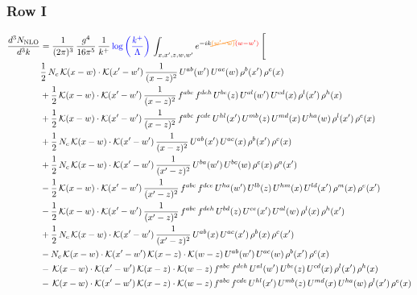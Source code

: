 \documentclass[9pt]{article}
\numberwithin{equation}{section}
\begin{document}
\subsubsection{Row I}
\begin{align}
\frac{d^{3}N_{\mathrm{NLO}}}{d^{3}k} & = \frac{1}{(2\pi)^{3}}\,\frac{g^{4}}{16\pi^{5}}\,\frac{1}{k^{+}}\,{\color{blue}\log{\left(\frac{k^{+}}{\Lambda}\right)}}\,\int_{x,x',z,w,w'}e^{-ik{\color{orange}\cancel{(w'-w)}}{\color{red}(w-w')}}\,\Bigg[\notag\\ & \frac{1}{2}\,N_{c}\,\mathcal{K}(x-w)\cdot\mathcal{K}(x'-w')\,\frac{1}{(x-z)^{2}}\,U^{ab}(w')\,U^{ac}(w)\,\rho^{b}(x')\,\rho^{c}(x)\notag\\
& +\frac{1}{2}\,\mathcal{K}(x-w)\cdot\mathcal{K}(x'-w')\,\frac{1}{(x-z)^{2}}\,f^{abc}\,f^{deh}\,U^{be}(z)\,U^{al}(w')\,U^{cd}(x)\,\rho^{l}(x')\,\rho^{h}(x)\notag\\
& +\frac{1}{2}\,\mathcal{K}(x-w)\cdot\mathcal{K}(x'-w')\,\frac{1}{(x-z)^{2}}\,f^{abc}\,f^{cde}\,U^{hl}(x')\,U^{mb}(z)\,U^{md}(x)\,U^{ha}(w)\,\rho^{l}(x')\,\rho^{e}(x)\notag\\
& +\frac{1}{2}\,N_{c}\,\mathcal{K}(x-w)\cdot\mathcal{K}(x'-w')\,\frac{1}{(x-z)^{2}}\,U^{ab}(x')\,U^{ac}(x)\,\rho^{b}(x')\,\rho^{c}(x)\notag\\
& +\frac{1}{2}\,N_{c}\,\mathcal{K}(x-w)\cdot\mathcal{K}(x'-w')\,\frac{1}{(x'-z)^{2}}\,U^{ba}(w')\,U^{bc}(w)\,\rho^{c}(x)\,\rho^{a}(x')\notag\\
& -\frac{1}{2}\,\mathcal{K}(x-w)\cdot\mathcal{K}(x'-w')\,\frac{1}{(x'-z)^{2}}\,f^{abc}\,f^{dce}\,U^{ha}(w')\,U^{lb}(z)\,U^{hm}(x)\,U^{ld}(x')\,\rho^{m}(x)\,\rho^{e}(x')\notag\\
& -\frac{1}{2}\,\mathcal{K}(x-w)\cdot\mathcal{K}(x'-w')\,\frac{1}{(x'-z)^{2}}\,f^{abc}\,f^{deh}\,U^{bd}(z)\,U^{ce}(x')\,U^{al}(w)\,\rho^{l}(x)\,\rho^{h}(x')\notag\\
& +\frac{1}{2}\,N_{c}\,\mathcal{K}(x-w)\cdot\mathcal{K}(x'-w')\,\frac{1}{(x'-z)^{2}}\,U^{ab}(x)\,U^{ac}(x')\,\rho^{b}(x)\,\rho^{c}(x')\notag\\
& -N_{c}\,\mathcal{K}(x-w)\cdot\mathcal{K}(x'-w')\,\mathcal{K}(x-z)\cdot\mathcal{K}(w-z)\,U^{ab}(w')\,U^{ac}(w)\,\rho^{b}(x')\,\rho^{c}(x)\notag\\
& -\,\mathcal{K}(x-w)\cdot\mathcal{K}(x'-w')\,\mathcal{K}(x-z)\cdot\mathcal{K}(w-z)\,f^{abc}\,f^{deh}\,U^{al}(w')\,U^{be}(z)\,U^{cd}(x)\,\rho^{l}(x')\,\rho^{h}(x)\notag\\
& -\,\mathcal{K}(x-w)\cdot\mathcal{K}(x'-w')\,\mathcal{K}(x-z)\cdot\mathcal{K}(w-z)\,f^{abc}\,f^{cde}\,U^{hl}(x')\,U^{mb}(z)\,U^{md}(x)\,U^{ha}(w)\,\rho^{l}(x')\,\rho^{e}(x)\notag\\

\end{align}
\end{document}
